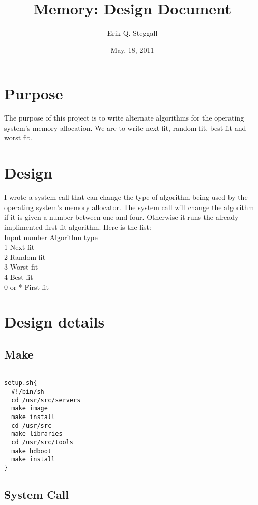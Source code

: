 \documentclass[a4paper, 12pt]{article}
\title{Memory: Design Document}
\date{May, 18, 2011}
\author{Erik Q. Steggall}
\begin{document}
\maketitle

\section{Purpose}
The purpose of this project is to write alternate algorithms for the operating system's memory allocation. We are to write next fit, random fit, best fit and worst fit.\\

\section{Design}
I wrote a system call that can change the type of algorithm being used by the operating system's memory allocator. The system call will change the algorithm if it is given a number between one and four. Otherwise it runs the already implimented first fit algorithm. Here is the list:\\
Input number            Algorithm type\\
    1                    Next fit\\
    2                    Random fit\\
    3                    Worst fit\\
    4                    Best fit\\
    0 or *               First fit\\

\section{Design details}

\subsection{Make}

\begin{verbatim}

setup.sh{
  #!/bin/sh
  cd /usr/src/servers
  make image
  make install
  cd /usr/src
  make libraries
  cd /usr/src/tools
  make hdboot
  make install
}
\end{verbatim}


\subsection{System Call}
\end{document}
